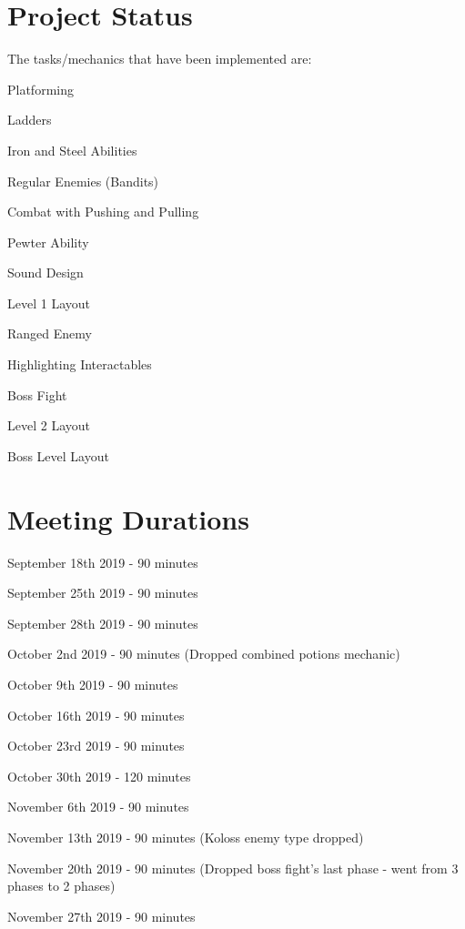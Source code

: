 \documentclass{article}
\begin{document}
\section{Project Status}
The tasks/mechanics that have been implemented are:
\begin{description}
	\item Platforming
	\item Ladders
	\item Iron and Steel Abilities
	\item Regular Enemies (Bandits)
	\item Combat with Pushing and Pulling
	\item Pewter Ability
	\item Sound Design
	\item Level 1 Layout
	\item Ranged Enemy
	\item Highlighting Interactables
	\item Boss Fight
	\item Level 2 Layout
	\item Boss Level Layout
	\end{description}

\section{Meeting Durations}
\begin{description}
	\item September 18th 2019 - 90 minutes 
	\item September 25th 2019 - 90 minutes
	\item September 28th 2019 - 90 minutes
	\item October 2nd 2019 - 90 minutes (Dropped combined potions mechanic)
	\item October 9th 2019 - 90 minutes
	\item October 16th 2019 - 90 minutes
	\item October 23rd 2019 - 90 minutes
	\item October 30th 2019 - 120 minutes
	\item November 6th 2019 - 90 minutes
	\item November 13th 2019 - 90 minutes (Koloss enemy type dropped)
	\item November 20th 2019 - 90 minutes (Dropped boss fight's last phase - went from 3 phases to 2 phases)
	\item November 27th 2019 - 90 minutes
	\end{description}
\end{document}
